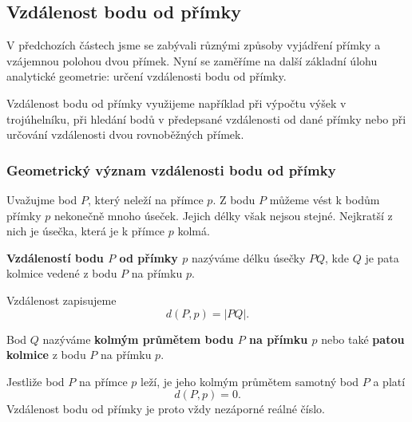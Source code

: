 \subsection{Vzdálenost bodu od přímky}
\label{subsec:Distance_point_line}

V předchozích částech jsme se zabývali různými způsoby vyjádření
přímky a vzájemnou polohou dvou přímek. Nyní se zaměříme na další
základní úlohu analytické geometrie: určení vzdálenosti bodu od
přímky.

Vzdálenost bodu od přímky využijeme například při výpočtu výšek
v trojúhelníku, při hledání bodů v předepsané vzdálenosti od dané
přímky nebo při určování vzdálenosti dvou rovnoběžných přímek.


\subsubsection{Geometrický význam vzdálenosti bodu od přímky}
\label{subsubsec:Geometric_meaning_distance_point_line}

Uvažujme bod $P$, který neleží na přímce $p$. Z bodu $P$ můžeme vést
k bodům přímky $p$ nekonečně mnoho úseček. Jejich délky však nejsou
stejné. Nejkratší z nich je úsečka, která je k přímce $p$ kolmá.

\begin{definition}\label{def:Distance_point_line}
    \textbf{Vzdáleností bodu $P$ od přímky $p$} nazýváme délku
    úsečky $PQ$, kde $Q$ je pata kolmice vedené z bodu $P$ na
    přímku $p$.

    Vzdálenost zapisujeme
    \[
        d(P,p)=|PQ|.
    \]
\end{definition}

Bod $Q$ nazýváme \textbf{kolmým průmětem bodu $P$ na přímku $p$}
nebo také \textbf{patou kolmice} z bodu $P$ na přímku $p$.

Jestliže bod $P$ na přímce $p$ leží, je jeho kolmým průmětem samotný
bod $P$ a platí
\[
    d(P,p)=0.
\]
Vzdálenost bodu od přímky je proto vždy nezáporné reálné číslo.

